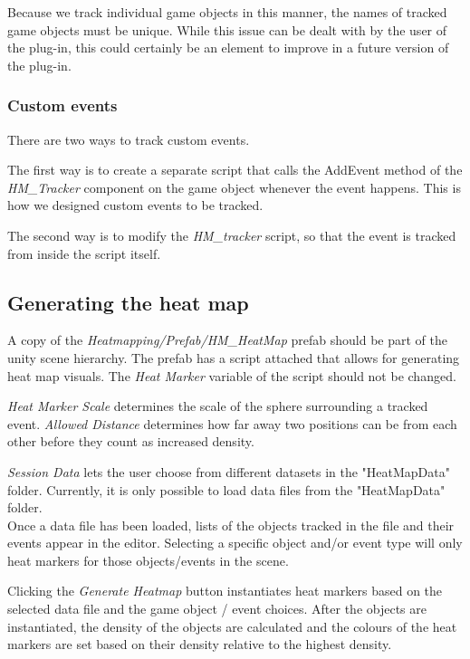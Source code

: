 Because we track individual game objects in this manner, the names of tracked game objects must be unique. While this issue can be dealt with by the user of the plug-in, this could certainly be an element to improve in a future version of the plug-in.

\subsubsection{Custom events}
There are two ways to track custom events. 

The first way is to create a separate script that calls the AddEvent method of the \textit{HM\_Tracker} component on the game object whenever the event happens. This is how we designed custom events to be tracked.

The second way is to modify the \textit{HM\_tracker} script, so that the event is tracked from inside the script itself.

\subsection{Generating the heat map}
\label{HowToUse_Generating}
A copy of the \textit{Heatmapping/Prefab/HM\_HeatMap} prefab should be part of the unity scene hierarchy. The prefab has a script attached that allows for generating heat map visuals. The \textit{Heat Marker} variable of the script should not be changed. 


\textit{Heat Marker Scale} determines the scale of the sphere surrounding a tracked event. \textit{Allowed Distance} determines how far away two positions can be from each other before they count as increased density.

\textit{Session Data} lets the user choose from different datasets in the "HeatMapData" folder. Currently, it is only possible to load data files from the "HeatMapData" folder.
\\Once a data file has been loaded, lists of the objects tracked in the file and their events appear in the editor. Selecting a specific object and/or event type will only heat markers for those objects/events in the scene.

Clicking the \textit{Generate Heatmap} button instantiates heat markers based on the selected data file and the game object / event choices. After the objects are instantiated, the density of the objects are calculated and the colours of the heat markers are set based on their density relative to the highest density.

